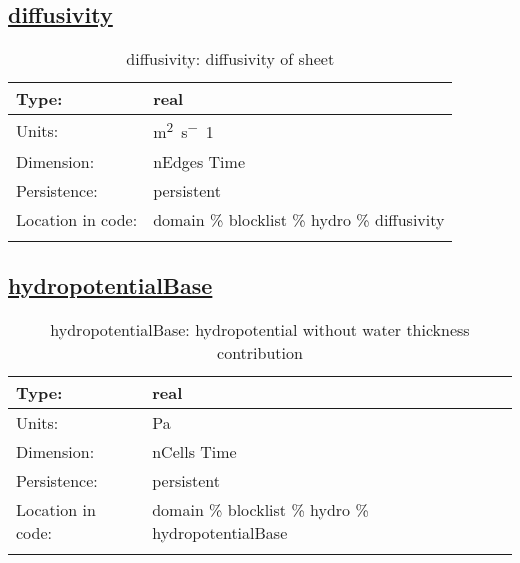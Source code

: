 \subsection[diffusivity]{\hyperref[sec:var_tab_hydro]{diffusivity}}
\label{subsec:var_sec_hydro_diffusivity}
\begin{center}
\begin{longtable}{| p{2.0in} | p{4.0in} |}
        \hline 
        Type: & real \\
        \hline 
        Units: & \si{m^2.s^-1} \\
        \hline 
        Dimension: & nEdges Time \\
        \hline 
        Persistence: & persistent \\
        \hline 
         Location in code: & domain \% blocklist \% hydro \% diffusivity \\
         \hline 
    \caption{diffusivity: diffusivity of sheet}
\end{longtable}
\end{center}
\subsection[hydropotentialBase]{\hyperref[sec:var_tab_hydro]{hydropotentialBase}}
\label{subsec:var_sec_hydro_hydropotentialBase}
\begin{center}
\begin{longtable}{| p{2.0in} | p{4.0in} |}
        \hline 
        Type: & real \\
        \hline 
        Units: & \si{Pa} \\
        \hline 
        Dimension: & nCells Time \\
        \hline 
        Persistence: & persistent \\
        \hline 
         Location in code: & domain \% blocklist \% hydro \% hydropotentialBase \\
         \hline 
    \caption{hydropotentialBase: hydropotential without water thickness contribution}
\end{longtable}
\end{center}
